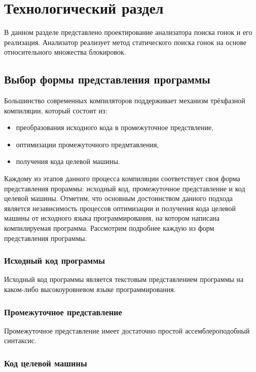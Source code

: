 \chapter{Технологический раздел}
\label{cha:impl}

В данном разделе представлено проектирование анализатора поиска гонок и его реализация. Анализатор реализует метод статического поиска гонок на основе относительного множества блокировок.

\section{Выбор формы представления программы}

Большинство современных компиляторов поддерживает механизм трёхфазной компиляции, который состоит из:
\begin{itemize}
  \item преобразования исходного кода в промежуточное предствление,
  \item оптимизации промежуточного предмтавления,
  \item получения кода целевой машины.
\end{itemize}
Каждому из этапов данного процесса компиляции соответствует своя форма представления прораммы: исходный код, промежуточное представление и код целевой машины. Отметим, что основным достоинством данного подхода является независимость процессов оптимизации и получения кода целевой машины от исходного языка программирования, на котором написана компилируемая программа. Рассмотрим подробнее каждую из форм представления программы.

\subsection{Исходный код программы}

Исходный код программы является текстовым представлением программы на каком-либо высокоуровневом языке программирования.

\subsection{Промежуточное представление}

Промежуточное представление имеет достаточно простой ассемблероподобный синтаксис.

\subsection{Код целевой машины}

